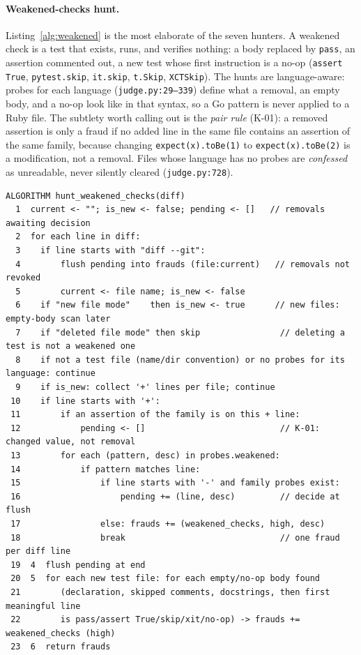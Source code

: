 \documentclass[11pt]{article}
\begin{document}
\paragraph{Weakened-checks hunt.} Listing~\ref{alg:weakened} is the most
elaborate of the seven hunters. A weakened check is a test that exists,
runs, and verifies nothing: a body replaced by \texttt{pass}, an assertion
commented out, a new test whose first instruction is a no-op
(\texttt{assert True}, \texttt{pytest.skip}, \texttt{it.skip},
\texttt{t.Skip}, \texttt{XCTSkip}). The hunts are language-aware: probes
for each language (\texttt{judge.py:29--339}) define what a removal, an
empty body, and a no-op look like in that syntax, so a Go pattern is never
applied to a Ruby file. The subtlety worth calling out is the
\emph{pair rule} (K-01): a removed assertion is only a fraud if no added
line in the same file contains an assertion of the same family, because
changing \texttt{expect(x).toBe(1)} to \texttt{expect(x).toBe(2)} is a
modification, not a removal. Files whose language has no probes are
\emph{confessed} as unreadable, never silently cleared
(\texttt{judge.py:728}).

\begin{lstlisting}[caption=weakened-checks hunt (kata/judge.py).,label=alg:weakened]
ALGORITHM hunt_weakened_checks(diff)
  1  current <- ""; is_new <- false; pending <- []   // removals awaiting decision
  2  for each line in diff:
  3    if line starts with "diff --git":
  4        flush pending into frauds (file:current)   // removals not revoked
  5        current <- file name; is_new <- false
  6    if "new file mode"    then is_new <- true      // new files: empty-body scan later
  7    if "deleted file mode" then skip                // deleting a test is not a weakened one
  8    if not a test file (name/dir convention) or no probes for its language: continue
  9    if is_new: collect '+' lines per file; continue
 10    if line starts with '+':
 11        if an assertion of the family is on this + line:
 12            pending <- []                           // K-01: changed value, not removal
 13        for each (pattern, desc) in probes.weakened:
 14            if pattern matches line:
 15                if line starts with '-' and family probes exist:
 16                    pending += (line, desc)         // decide at flush
 17                else: frauds += (weakened_checks, high, desc)
 18                break                               // one fraud per diff line
 19  4  flush pending at end
 20  5  for each new test file: for each empty/no-op body found
 21        (declaration, skipped comments, docstrings, then first meaningful line
 22        is pass/assert True/skip/xit/no-op) -> frauds += weakened_checks (high)
 23  6  return frauds
\end{lstlisting}
\end{document}

